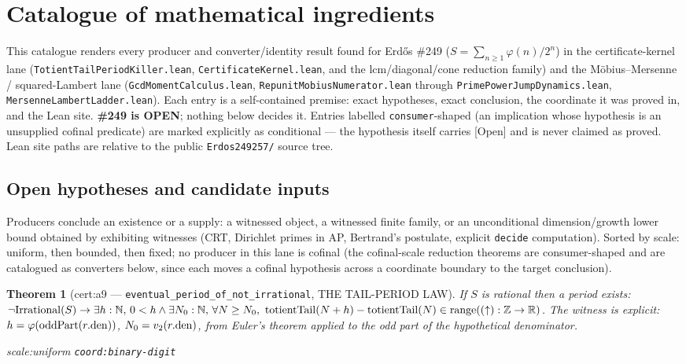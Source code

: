 \documentclass[11pt]{article}
\theoremstyle{plain}
\newtheorem{thm}{Theorem}[section]
\theoremstyle{definition}
\theoremstyle{remark}
\newcommand{\lean}[2]{\leanlink{#2}}
\let\origmathrm\mathrm
\renewcommand{\mathrm}[1]{\ifmmode\origmathrm{#1}\else\textrm{#1}\fi}%
\newcommand{\ev}[1]{{\small\textsf{[#1]}}\xspace}
\newcommand{\scale}[1]{{\small\textsf{scale:#1}}\xspace}
\newcommand{\coord}[1]{\texorpdfstring{{\small\nolinkurl{coord:#1}}}{coord:#1}\xspace}
\begin{document}
\section{Catalogue of mathematical ingredients}

This catalogue renders every producer and converter/identity result found for Erd\H{o}s
\#249 ($S = \sum_{n\ge1}\varphi(n)/2^n$) in the certificate-kernel lane
(\texttt{TotientTailPeriodKiller.lean}, \texttt{CertificateKernel.lean}, and the
lcm/diagonal/cone reduction family) and the M\"obius--Mersenne / squared-Lambert lane
(\texttt{GcdMomentCalculus.lean}, \texttt{RepunitMobiusNumerator.lean} through
\texttt{PrimePowerJumpDynamics.lean}, \texttt{MersenneLambertLadder.lean}). Each entry
is a self-contained premise: exact hypotheses, exact conclusion, the coordinate it was
proved in, and the Lean site. \textbf{\#249 is OPEN}; nothing below decides it. Entries
labelled \texttt{consumer}-shaped (an implication whose hypothesis is an unsupplied
cofinal predicate) are marked explicitly as conditional — the hypothesis itself carries
\ev{Open} and is never claimed as proved. Lean site paths are relative to the
public \texttt{Erdos249257/} source tree.

\subsection{Open hypotheses and candidate inputs}

Producers conclude an existence or a supply: a witnessed object, a witnessed finite
family, or an unconditional dimension/growth lower bound obtained by exhibiting
witnesses (CRT, Dirichlet primes in AP, Bertrand's postulate, explicit \texttt{decide}
computation). Sorted by scale: uniform, then bounded, then fixed; no producer in this
lane is cofinal (the cofinal-scale reduction theorems are consumer-shaped and are
catalogued as converters below, since each moves a cofinal hypothesis across a
coordinate boundary to the target conclusion).

\begin{thm}[cert:a9 --- \texttt{eventual\_period\_of\_not\_irrational}, THE TAIL-PERIOD LAW]
If $S$ is rational then a period exists: $\neg\mathrm{Irrational}(S) \to \exists h:\mathbb{N},\, 0<h \wedge \exists N_0:\mathbb{N},\, \forall N\ge N_0,\ \mathrm{totientTail}(N+h) - \mathrm{totientTail}(N) \in \mathrm{range}((\uparrow):\mathbb{Z}\to\mathbb{R})$. The witness is explicit: $h = \varphi(\mathrm{oddPart}(r.\mathrm{den}))$, $N_0 = v_2(r.\mathrm{den})$, from Euler's theorem applied to the odd part of the hypothetical denominator.
\par\noindent\ev{Lean} \scale{uniform} \coord{binary-digit} \lean{eventual\_period\_of\_not\_irrational}{TotientTailPeriodKiller.lean:358}
\end{thm}
\end{document}

